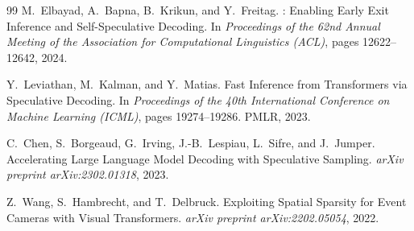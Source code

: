 \documentclass{article}
\begin{document}
\begin{thebibliography}{99}
M.~Elbayad, A.~Bapna, B.~Krikun, and Y.~Freitag.
: Enabling Early Exit Inference and Self-Speculative Decoding.
\newblock In \emph{Proceedings of the 62nd Annual Meeting of the Association for Computational Linguistics (ACL)}, pages 12622--12642, 2024.

Y.~Leviathan, M.~Kalman, and Y.~Matias.
\newblock Fast Inference from Transformers via Speculative Decoding.
\newblock In \emph{Proceedings of the 40th International Conference on Machine Learning (ICML)}, pages 19274--19286. PMLR, 2023.

C.~Chen, S.~Borgeaud, G.~Irving, J.-B.~Lespiau, L.~Sifre, and J.~Jumper.
\newblock Accelerating Large Language Model Decoding with Speculative Sampling.
\newblock \emph{arXiv preprint arXiv:2302.01318}, 2023.

Z.~Wang, S.~Hambrecht, and T.~Delbruck.
\newblock Exploiting Spatial Sparsity for Event Cameras with Visual Transformers.
\newblock \emph{arXiv preprint arXiv:2202.05054}, 2022.

\end{thebibliography}
\end{document}

